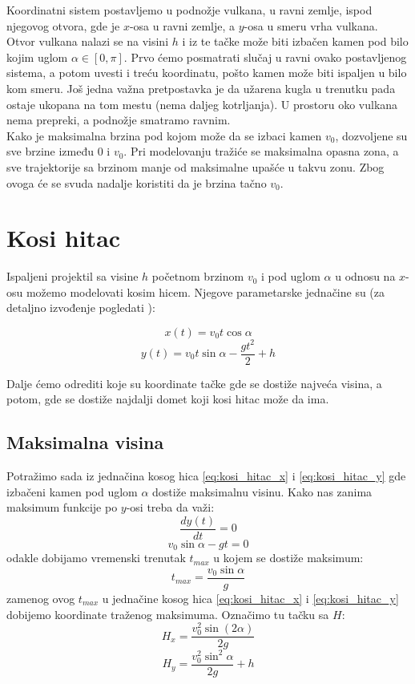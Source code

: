 \documentclass[a4paper]{article}
\begin{document}
Koordinatni sistem postavljemo u podnožje vulkana, u ravni zemlje, ispod njegovog otvora,
gde je $x$-osa u ravni zemlje, a $y$-osa u smeru vrha vulkana.
Otvor vulkana nalazi se na visini $h$ i iz te tačke može biti izbačen kamen pod bilo
kojim uglom $\alpha \in [0, \pi]$. Prvo ćemo posmatrati slučaj u ravni ovako postavljenog 
sistema, a potom uvesti i treću koordinatu, pošto kamen može biti ispaljen u bilo kom smeru. Još jedna važna pretpostavka je da užarena kugla u trenutku pada ostaje ukopana
na tom mestu (nema daljeg kotrljanja). U prostoru oko vulkana nema prepreki, a podnožje
smatramo ravnim. \\

Kako je maksimalna brzina pod kojom može da se izbaci kamen $v_0$, dozvoljene su sve brzine
između 0 i $v_0$. Pri modelovanju tražiće se maksimalna opasna zona, a 
sve trajektorije sa brzinom manje od maksimalne upašće u takvu zonu. Zbog ovoga će se svuda
nadalje koristiti da je brzina tačno $v_0$.

\section{Kosi hitac}
\label{sec:kosi_hitac}
Ispaljeni projektil sa visine $h$ početnom brzinom $v_0$ i pod uglom $\alpha$ u 
odnosu na $x$-osu možemo modelovati kosim hicem. Njegove parametarske jednačine su 
(za detaljno izvođenje pogledati \cite{Drazic}):

\begin{equation}
\label{eq:kosi_hitac_x}
x(t) = v_0 t \cos \alpha
\end{equation}
\begin{equation}
\label{eq:kosi_hitac_y}
y(t) = v_0 t \sin \alpha - \frac{gt^2}{2} + h
\end{equation}

Dalje ćemo odrediti koje su koordinate tačke gde se dostiže najveća visina, a potom,
gde se dostiže najdalji domet koji kosi hitac može da ima.


\subsection{Maksimalna visina}
\label{sec:max_visina}
Potražimo sada iz jednačina kosog hica \ref{eq:kosi_hitac_x} i \ref{eq:kosi_hitac_y}
gde izbačeni kamen pod uglom $\alpha$ dostiže maksimalnu visinu. Kako nas zanima 
maksimum funkcije po $y$-osi treba da važi:
$$ \frac{dy(t)}{dt} = 0 $$ 
$$ v_0 \sin \alpha - gt = 0 $$
odakle dobijamo vremenski trenutak $t_{max}$ u kojem se dostiže maksimum:
$$ t_{max} = \frac{v_0 \sin \alpha}{g} $$
zamenog ovog $t_{max}$ u jednačine kosog hica \ref{eq:kosi_hitac_x} i \ref{eq:kosi_hitac_y}
dobijemo koordinate traženog maksimuma. Označimo tu tačku sa $H$:
\begin{equation}
\label{eq:Hx}
H_{x} = \frac{v_0^2 \sin(2 \alpha)}{2g}
\end{equation}
\begin{equation}
\label{eq:Hy}
H_{y} = \frac{v_0^2 \sin^2 \alpha}{2g} + h
\end{equation}
\end{document}
